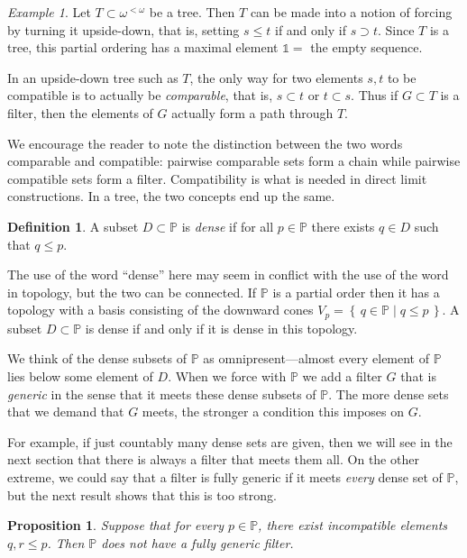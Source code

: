 \documentclass[11pt,oneside]{amsbook}
\newcommand{\set}[1]{\left\{\,#1\,\right\}}
\newcommand{\PP}{\mathbb P}
\theoremstyle{definition}
\theoremstyle{plain}
\newtheorem{prop}[thm]{Proposition}
\theoremstyle{definition}
\newtheorem{defn}[thm]{Definition}
\theoremstyle{remark}
\newtheorem{example}[thm]{Example}
\numberwithin{equation}{section}
\numberwithin{figure}{section}
\begin{document}
\begin{example}
  Let $T\subset\omega^{<\omega}$ be a tree. Then $T$ can be made into a notion of forcing by turning it upside-down, that is, setting $s\leq t$ if and only if $s\supset t$. Since $T$ is a tree, this partial ordering has a maximal element $\mathbb1=$ the empty sequence.

  In an upside-down tree such as $T$, the only way for two elements $s,t$ to be compatible is to actually be \emph{comparable}, that is, $s\subset t$ or $t\subset s$. Thus if $G\subset T$ is a filter, then the elements of $G$ actually form a path through $T$.
\end{example}

We encourage the reader to note the distinction between the two words comparable and compatible: pairwise comparable sets form a chain while pairwise compatible sets form a filter. Compatibility is what is needed in direct limit constructions. In a tree, the two concepts end up the same.

\begin{defn}
  A subset $D\subset\PP$ is \emph{dense} if for all $p\in\PP$ there exists $q\in D$ such that $q\leq p$.
\end{defn}

The use of the word ``dense'' here may seem in conflict  with the use of the word in topology, but the two can be connected. If $\PP$ is a partial order then it has a topology with a basis consisting of the downward cones $V_p=\set{q\in\PP\mid q\leq p}$. A subset $D\subset\PP$ is dense if and only if it is dense in this topology.

We think of the dense subsets of $\PP$ as omnipresent---almost every element of $\PP$ lies below some element of $D$. When we force with $\PP$ we add a filter $G$ that is \emph{generic} in the sense that it meets these dense subsets of $\PP$. The more dense sets that we demand that $G$ meets, the stronger a condition this imposes on $G$.

For example, if just countably many dense sets are given, then we will see in the next section that there is always a filter that meets them all. On the other extreme, we could say that a filter is fully generic if it meets \emph{every} dense set of $\PP$, but the next result shows that this is too strong.

\begin{prop}
  \label{prop:generic-new}
  Suppose that for every $p\in\PP$, there exist incompatible elements $q,r\leq p$. Then $\PP$ does not have a fully generic filter.
\end{prop}
\end{document}
